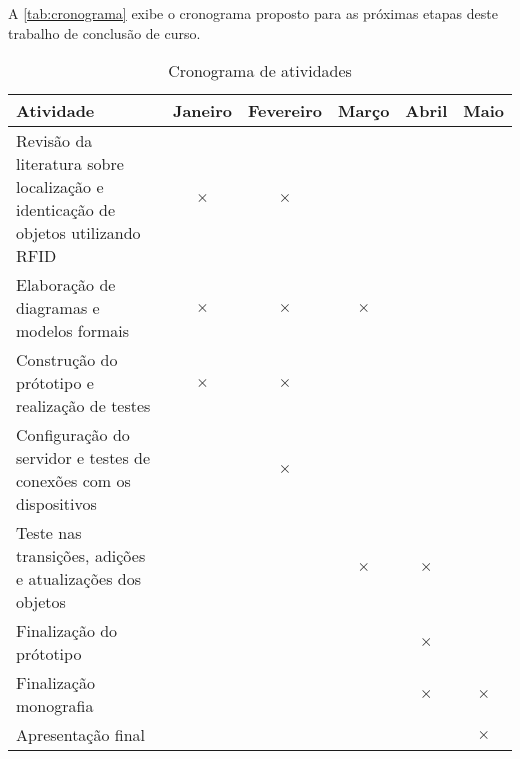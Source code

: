 \label{chapter:cronograma}

A \autoref{tab:cronograma} exibe o cronograma proposto para as próximas etapas deste trabalho de conclusão de curso.

\begin{table}[htbp]
  \centering
  \caption{Cronograma de atividades}
  \label{tab:cronograma}
  \begin{tabularx}{\textwidth}{|X|c|c|c|c|c|}
    \hline
    \textbf{Atividade} & \textbf{Janeiro} & \textbf{Fevereiro} & \textbf{Março} & \textbf{Abril} & \textbf{Maio} \\
    \hline
    Revisão da literatura sobre localização e identicação de objetos utilizando RFID & \(\times\) & \(\times\) & & & \\
    \hline
    Elaboração de diagramas e modelos formais & \(\times\) &  \(\times\) & \(\times\) & & \\
    \hline
    Construção do prótotipo e realização de testes & \(\times\) &  \(\times\) & & & \\
    \hline
   Configuração do servidor e testes de conexões com os dispositivos & & \(\times\) & & & \\
    \hline
    Teste nas transições, adições e atualizações dos objetos & & & \(\times\) & \(\times\) &  \\
    \hline
    Finalização do prótotipo & & &  & \(\times\) & \\
    \hline
    Finalização monografia & & & & \(\times\) & \(\times\) \\
    \hline
    Apresentação final & & & &  & \(\times\) \\
    \hline
  \end{tabularx}
\end{table}
